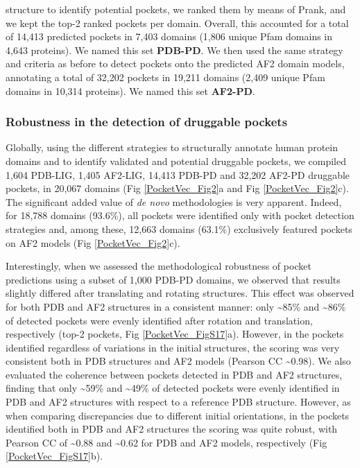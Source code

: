 structure to identify potential pockets, we ranked them by means of Prank, and we kept the top-2 ranked pockets per domain. Overall, this accounted for a total of 14,413 predicted pockets in 7,403 domains (1,806 unique Pfam domains in 4,643 proteins). We named this set \textbf{PDB-PD}. We then used the same strategy and criteria as before to detect pockets onto the predicted AF2 domain models, annotating a total of 32,202 pockets in 19,211 domains (2,409 unique Pfam domains in 10,314 proteins). We named this set \textbf{AF2-PD}.




\subsubsection{Robustness in the detection of druggable pockets}
\label{PocketVec_ResultsAndDiscussion_Robustness_Detection}

Globally, using the different strategies to structurally annotate human protein domains and to identify validated and potential druggable pockets, we compiled 1,604 PDB-LIG, 1,405 AF2-LIG, 14,413 PDB-PD and 32,202 AF2-PD druggable pockets, in 20,067 domains (Fig \ref{PocketVec_Fig2}a and Fig \ref{PocketVec_Fig2}c). The significant added value of \textit{de novo} methodologies is very apparent. Indeed, for 18,788 domains (93.6\%), all pockets were identified only with pocket detection strategies and, among these, 12,663 domains (63.1\%) exclusively featured pockets on AF2 models (Fig \ref{PocketVec_Fig2}c).

Interestingly, when we assessed the methodological robustness of pocket predictions using a subset of 1,000 PDB-PD domains, we observed that results slightly differed after translating and rotating structures. This effect was observed for both PDB and AF2 structures in a consistent manner: only \textasciitilde85\% and \textasciitilde86\% of detected pockets were evenly identified after rotation and translation, respectively (top-2 pockets, Fig \ref{PocketVec_FigS17}a). However, in the pockets identified regardless of variations in the initial structures, the scoring was very consistent both in PDB structures and AF2 models (Pearson CC \textasciitilde0.98). We also evaluated the coherence between pockets detected in PDB and AF2 structures, finding that only \textasciitilde59\% and \textasciitilde49\% of detected pockets were evenly identified in PDB and AF2 structures with respect to a reference PDB structure. However, as when comparing discrepancies due to different initial orientations, in the pockets identified both in PDB and AF2 structures the scoring was quite robust, with Pearson CC of \textasciitilde0.88 and \textasciitilde0.62 for PDB and AF2 models, respectively (Fig \ref{PocketVec_FigS17}b). 

